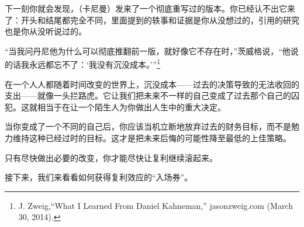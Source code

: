 {\kaishu

下一刻你就会发现，（卡尼曼）发来了一个彻底重写过的版本。你已经认不出它来了：开头和结尾都完全不同，里面提到的轶事和证据是你从没想过的，引用的研究也是你从没听说过的。

}

“当我问丹尼他为什么可以彻底推翻前一版，就好像它不存在时，”茨威格说，“他说的话我永远都忘不了：‘我没有沉没成本。’”\footnote{J. Zweig,“What I Learned From Daniel Kahneman,” jasonzweig.com (March 30, 2014).}

在一个人人都随着时间改变的世界上，沉没成本——过去的决策导致的无法收回的支出——就像一头拦路虎。它让我们把未来不一样的自己变成了过去那个自己的囚犯。这就相当于在让一个陌生人为你做出人生中的重大决定。

当你变成了一个不同的自己后，你应该当机立断地放弃过去的财务目标，而不是勉力维持这种已经过时的目标。这才是把未来后悔的可能性降至最低的上佳策略。

只有尽快做出必要的改变，你才能尽快让复利继续滚起来。

接下来，我们来看看如何获得复利效应的“入场券”。
